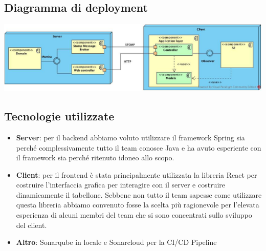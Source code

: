 \documentclass{article}
\begin{document}
\subsection{Diagramma di deployment}
\href{https://github.com/UnimibSoftEngCourse2022/progetto-monopoly-1-gangoffour2/blob/feat/doc/doc/img/DiagrammaDiDeployment.jpg?raw=true}
	{\includegraphics[width=\textwidth]{img/DiagrammaDiDeployment.jpg}}

\subsection{Tecnologie utilizzate}
\begin{itemize}
	\item \textbf{Server}: per il backend abbiamo voluto utilizzare il framework Spring sia perché complessivamente tutto il team conosce Java e ha avuto esperiente con il framework sia perché ritenuto idoneo allo scopo.


	\item \textbf{Client}: per il frontend è stata principalmente utilizzata la libreria React per costruire l'interfaccia grafica per interagire con il server e costruire dinamicamente il tabellone.
	Sebbene non tutto il team sapesse come utilizzare questa libreria abbiamo convenuto fosse la scelta più ragionevole per l'elevata esperienza di alcuni membri del team che si sono concentrati sullo sviluppo del client.
	
	\item \textbf{Altro}: Sonarqube in locale e Sonarcloud per la CI/CD Pipeline
\end{itemize}
\end{document}
